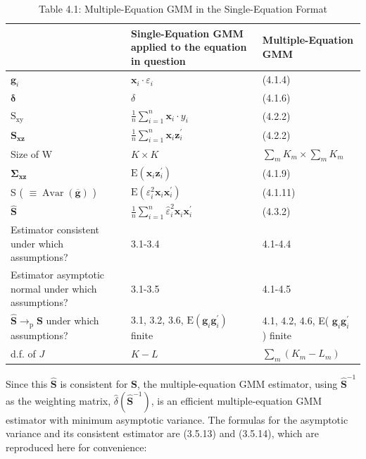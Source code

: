 \documentclass[10pt]{article}
\begin{document}
\begin{table}[h]
\begin{center}
\captionsetup{labelformat=empty}
\caption{Table 4.1: Multiple-Equation GMM in the Single-Equation Format}
\begin{tabular}{|l|l|l|}
\hline
 & Single-Equation GMM applied to the equation in question & Multiple-Equation GMM \\
\hline
$\mathbf{g}_{i}$ & $\mathbf{x}_{i} \cdot \varepsilon_{i}$ & (4.1.4) \\
\hline
$\boldsymbol{\delta}$ & $\delta$ & (4.1.6) \\
\hline
$\mathrm{S}_{\mathrm{xy}}$ & $\frac{1}{n} \sum_{i=1}^{n} \mathbf{x}_{i} \cdot y_{i}$ & (4.2.2) \\
\hline
$\mathbf{S}_{\mathbf{x z}}$ & $\frac{1}{n} \sum_{i=1}^{n} \mathbf{x}_{i} \mathbf{z}_{i}^{\prime}$ & (4.2.2) \\
\hline
Size of W & $K \times K$ & $\sum_{m} K_{m} \times \sum_{m} K_{m}$ \\
\hline
$\boldsymbol{\Sigma}_{\mathbf{x z}}$ & $\mathrm{E}\left(\mathbf{x}_{i} \boldsymbol{z}_{i}^{\prime}\right)$ & (4.1.9) \\
\hline
S ( $\equiv \operatorname{Avar}(\overline{\mathbf{g}})$ ) & $\mathrm{E}\left(\varepsilon_{i}^{2} \mathbf{x}_{i} \mathbf{x}_{i}^{\prime}\right)$ & (4.1.11) \\
\hline
$\widehat{\mathbf{S}}$ & $\frac{1}{n} \sum_{i=1}^{n} \hat{\varepsilon}_{i}^{2} \mathbf{x}_{i} \mathbf{x}_{i}^{\prime}$ & (4.3.2) \\
\hline
Estimator consistent under which assumptions? & 3.1-3.4 & 4.1-4.4 \\
\hline
Estimator asymptotic normal under which assumptions? & 3.1-3.5 & 4.1-4.5 \\
\hline
$\widehat{\mathbf{S}} \rightarrow_{\mathrm{p}} \mathbf{S}$ under which assumptions? & 3.1, 3.2, 3.6, $\mathrm{E}\left(\mathbf{g}_{i} \mathbf{g}_{i}^{\prime}\right)$ finite & 4.1, 4.2, 4.6, E( $\mathbf{g}_{i} \mathbf{g}_{i}^{\prime}$ ) finite \\
\hline
d.f. of $J$ & $K-L$ & $\sum_{m}\left(K_{m}-L_{m}\right)$ \\
\hline
\end{tabular}
\end{center}
\end{table}

Since this $\widehat{\mathbf{S}}$ is consistent for $\mathbf{S}$, the multiple-equation GMM estimator, using $\widehat{\mathbf{S}}^{-1}$ as the weighting matrix, $\hat{\delta}\left(\widehat{\mathbf{S}}^{-1}\right)$, is an efficient multiple-equation GMM estimator with minimum asymptotic variance. The formulas for the asymptotic variance and its consistent estimator are (3.5.13) and (3.5.14), which are reproduced here for convenience:
\end{document}
